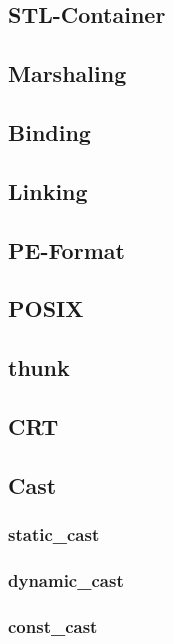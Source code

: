 \begin{multicols}{3}
\subsection{STL-Container}
\lipsum[1]

\subsection{Marshaling}
\lipsum[1]

\subsection{Binding}
\lipsum[1]

\subsection{Linking}
\lipsum[1]

\subsection{PE-Format}
\lipsum[1]

\subsection{POSIX}
\lipsum[1]

\subsection{thunk}
\lipsum[1]
\subsection{CRT}
\lipsum[1]

\subsection{Cast}

\subsubsection{static\_cast}
\lipsum[1]
\subsubsection{dynamic\_cast}
\lipsum[1]
\subsubsection{const\_cast}
\lipsum[1]

\end{multicols}
